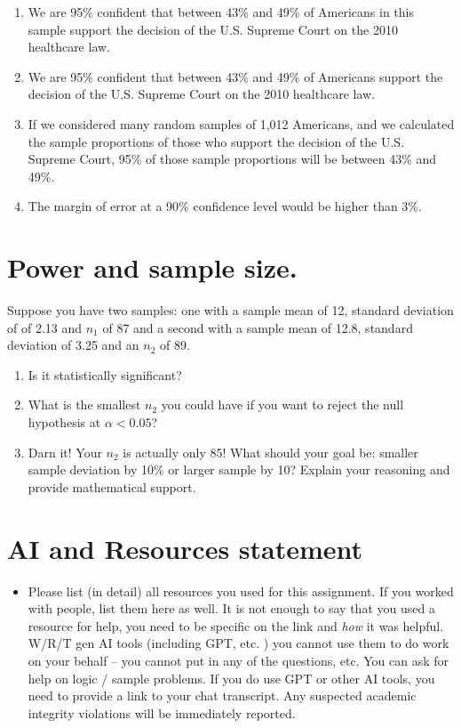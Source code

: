 \documentclass[
]{article}
\providecommand{\tightlist}{%
  \setlength{\itemsep}{0pt}\setlength{\parskip}{0pt}}
\begin{document}
\begin{enumerate}
\def\labelenumi{\alph{enumi}.}
\item
  We are 95\% confident that between 43\% and 49\% of Americans in this
  sample support the decision of the U.S. Supreme Court on the 2010
  healthcare law.
\item
  We are 95\% confident that between 43\% and 49\% of Americans support
  the decision of the U.S. Supreme Court on the 2010 healthcare law.
\item
  If we considered many random samples of 1,012 Americans, and we
  calculated the sample proportions of those who support the decision of
  the U.S. Supreme Court, 95\% of those sample proportions will be
  between 43\% and 49\%.
\item
  The margin of error at a 90\% confidence level would be higher than
  3\%.
\end{enumerate}

\section{Power and sample size.}\label{power-and-sample-size.}

Suppose you have two samples: one with a sample mean of 12, standard
deviation of of 2.13 and \(n_1\) of 87 and a second with a sample mean
of 12.8, standard deviation of 3.25 and an \(n_2\) of 89.

\begin{enumerate}
\def\labelenumi{\alph{enumi}.}
\tightlist
\item
  Is it statistically significant?
\item
  What is the smallest \(n_2\) you could have if you want to reject the
  null hypothesis at \(\alpha < 0.05\)?
\item
  Darn it! Your \(n_2\) is actually only 85! What should your goal be:
  smaller sample deviation by 10\% or larger sample by 10? Explain your
  reasoning and provide mathematical support.
\end{enumerate}

\section{AI and Resources statement}\label{ai-and-resources-statement}

\begin{itemize}
\tightlist
\item
  Please list (in detail) all resources you used for this assignment. If
  you worked with people, list them here as well. It is not enough to
  say that you used a resource for help, you need to be specific on the
  link and \emph{how} it was helpful. W/R/T gen AI tools (including GPT,
  etc. ) you cannot use them to do work on your behalf -- you cannot put
  in any of the questions, etc. You can ask for help on logic / sample
  problems. If you do use GPT or other AI tools, you need to provide a
  link to your chat transcript. Any suspected academic integrity
  violations will be immediately reported.
\end{itemize}
\end{document}
